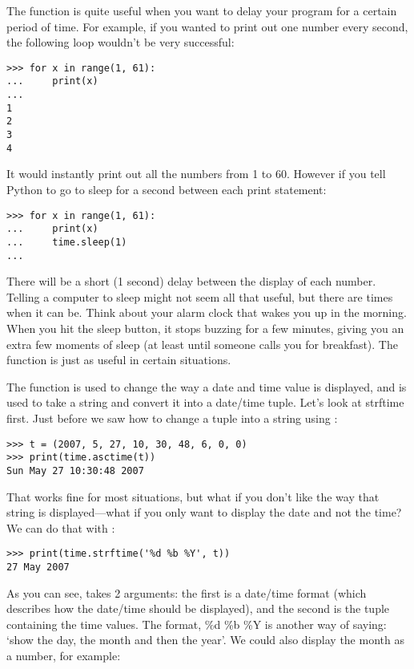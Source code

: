 \noindent
The function  is quite useful when you want to delay your program for a certain period of time.  For example, if you wanted to print out one number every second, the following loop wouldn't be very successful:

\begin{Verbatim}[frame=single]
>>> for x in range(1, 61):
...     print(x)
...
1
2
3
4
\end{Verbatim}

It would instantly print out all the numbers from 1 to 60. However if you tell Python to go to sleep for a second between each print statement:

\begin{Verbatim}[frame=single]
>>> for x in range(1, 61):
...     print(x)
...     time.sleep(1)
...
\end{Verbatim}

\noindent
There will be a short (1 second) delay between the display of each number. Telling a computer to sleep might not seem all that useful, but there are times when it can be.  Think about your alarm clock that wakes you up in the morning.  When you hit the sleep button, it stops buzzing for a few minutes, giving you an extra few moments of sleep (at least until someone calls you for breakfast).  The  function is just as useful in certain situations.

The function  is used to change the way a date and time value is displayed, and  is used to take a string and convert it into a date/time tuple. Let's look at strftime first.  Just before we saw how to change a tuple into a string using :

\begin{Verbatim}[frame=single]
>>> t = (2007, 5, 27, 10, 30, 48, 6, 0, 0)
>>> print(time.asctime(t))
Sun May 27 10:30:48 2007
\end{Verbatim}

\noindent
That works fine for most situations, but what if you don't like the way that string is displayed---what if you only want to display the date and not the time?  We can do that with :

\begin{Verbatim}[frame=single]
>>> print(time.strftime('%d %b %Y', t))
27 May 2007
\end{Verbatim}

As you can see,  takes 2 arguments:  the first is a date/time format (which describes how the date/time should be displayed), and the second is the tuple containing the time values.  The format, \%d \%b \%Y is another way of saying: `show the day, the month and then the year'.  We could also display the month as a number, for example:

